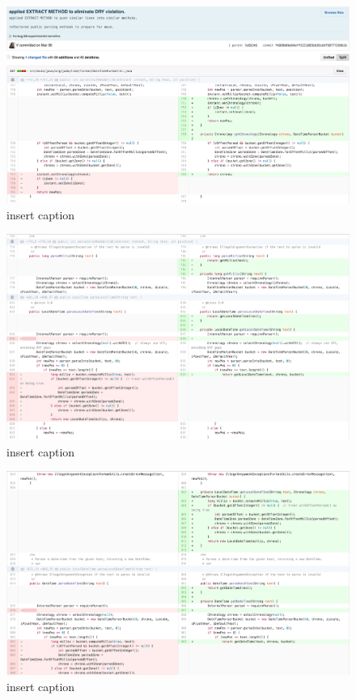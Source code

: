\begin{figure}[H]
	\centering
	\includegraphics[width=\linewidth]{code37}
	\caption{insert caption}
\end{figure}
\begin{figure}[H]
	\centering
	\includegraphics[width=\linewidth]{code38}
	\caption{insert caption}
\end{figure}
\begin{figure}[H]
	\centering
	\includegraphics[width=\linewidth]{code39}
	\caption{insert caption}
\end{figure}
